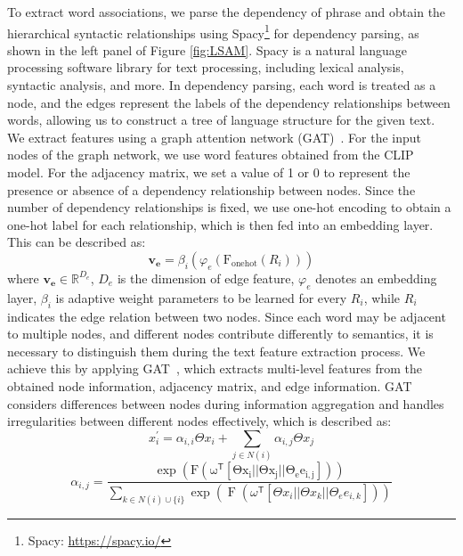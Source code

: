\documentclass[10pt,twocolumn,letterpaper]{article}
\begin{document}
To extract word associations, we parse the dependency of phrase and obtain the hierarchical syntactic relationships using Spacy\footnote{Spacy: \url{https://spacy.io/}} for dependency parsing, as shown in the left panel of Figure \ref{fig:LSAM}. Spacy is a natural language processing software library for text processing, including lexical analysis, syntactic analysis, and more. In dependency parsing, each word is treated as a node, and the edges represent the labels of the dependency relationships between words, allowing us to construct a tree of language structure for the given text. We extract features using a graph attention network (GAT)~\cite{velivckovic2017graph}. For the input nodes of the graph network, we use word features obtained from the CLIP~\cite{radford2021learning} model. For the adjacency matrix, we set a value of 1 or 0 to represent the presence or absence of a dependency relationship between nodes. Since the number of dependency relationships is fixed, we use one-hot encoding to obtain a one-hot label for each relationship, which is then fed into an embedding layer. This can be described as:
\begin{equation}
    \mathbf{v_e}=\beta_i(\varphi_e(\operatorname{F_{onehot}}(R_i)))
\end{equation}
where $\mathbf{v_e} \in \mathbb{R}^{D_e}$, $D_e$ is the dimension of edge feature, $\varphi_e$ denotes an embedding layer, $\beta_i$ is adaptive weight parameters to be learned for every $R_i$, while $R_i$ indicates the edge relation between two nodes.
Since each word may be adjacent to multiple nodes, and different nodes contribute differently to semantics, it is necessary to distinguish them during the text feature extraction process.
We achieve this by applying GAT~\cite{velivckovic2017graph}, which extracts multi-level features from the obtained node information, adjacency matrix, and edge information. GAT~\cite{velivckovic2017graph} considers differences between nodes during information aggregation and handles irregularities between different nodes effectively, which is described as:
\begin{equation}
{x}_{i}^{\prime}=\alpha_{i, i}  \Theta {x}_{i} +\sum_{j \in N(i)} \alpha_{i, j} \Theta {x}_{j}
\end{equation}
\begin{equation}
    \alpha_{i, j} =\frac{\operatorname{exp} (\operatorname{F(\omega^{\mathsf{T}} [ \Theta {x}_{i}||\Theta {x}_{j}||\Theta_{e} {e}_{i, j} ])} ) }
    {\sum_{k \in N(i)\cup {\{i\}}} \operatorname{exp} (\operatorname{F}  (\omega^{\mathsf{T}} [\Theta {x}_{i}||\Theta {x}_{k}||\Theta_{e} {e}_{i, k}] )  ) }
\end{equation}
\end{document}

